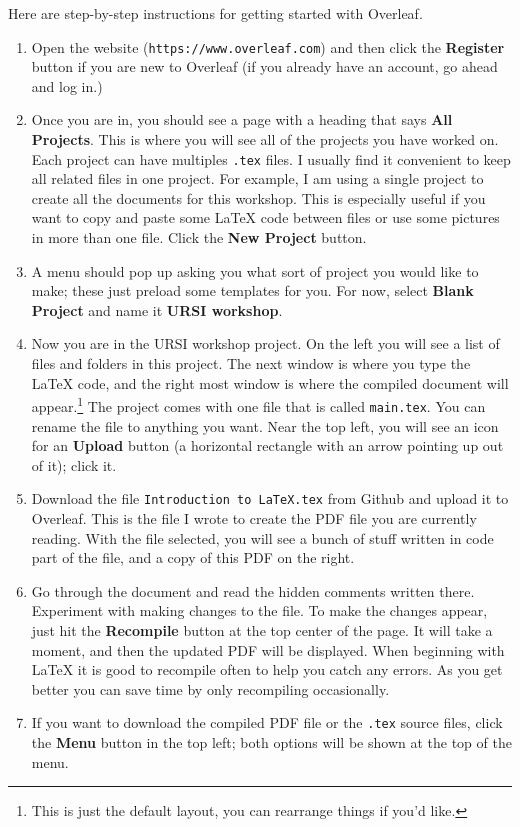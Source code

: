 \documentclass[11pt]{article}
\begin{document}
Here are step-by-step instructions for getting started with Overleaf.
\begin{enumerate}
    \item Open the website (\texttt{https://www.overleaf.com}) and then click the \textbf{Register} button if you are new to Overleaf (if you already have an account, go ahead and log in.)

    \item Once you are in, you should see a page with a heading that says \textbf{All Projects}.
    This is where you will see all of the projects you have worked on.
    Each project can have multiples \texttt{.tex} files.
    I usually find it convenient to keep all related files in one project.
    For example, I am using a single project to create all the documents for this workshop.
    This is especially useful if you want to copy and paste some LaTeX code between files or use some pictures in more than one file.
    Click the \textbf{New Project} button.

    \item A menu should pop up asking you what sort of project you would like to make; these just preload some templates for you.
    For now, select \textbf{Blank Project} and name it \textbf{URSI workshop}.

    \item Now you are in the URSI workshop project.
    On the left you will see a list of files and folders in this project.
    The next window is where you type the LaTeX code, and the right most window is where the compiled document will appear.\footnote{This is just the default layout, you can rearrange things if you'd like.}
    The project comes with one file that is called \texttt{main.tex}.
    You can rename the file to anything you want.
    Near the top left, you will see an icon for an \textbf{Upload} button (a horizontal rectangle with an arrow pointing up out of it); click it.

    \item Download the file \texttt{Introduction to LaTeX.tex} from Github and upload it to Overleaf.
    This is the file I wrote to create the PDF file you are currently reading.
    With the file selected, you will see a bunch of stuff written in code part of the file, and a copy of this PDF on the right.

    \item Go through the document and read the hidden comments written there.
    Experiment with making changes to the file.
    To make the changes appear, just hit the \textbf{Recompile} button at the top center of the page.
    It will take a moment, and then the updated PDF will be displayed.
    When beginning with LaTeX it is good to recompile often to help you catch any errors.
    As you get better you can save time by only recompiling occasionally.

    \item If you want to download the compiled PDF file or the \texttt{.tex} source files, click the \textbf{Menu} button in the top left; both options will be shown at the top of the menu.
\end{enumerate}
\end{document}
